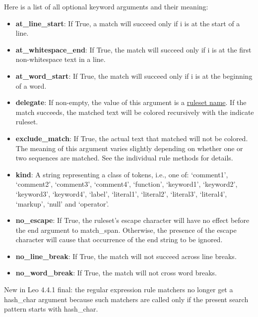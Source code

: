 \documentclass[a4paper,10pt,english]{sphinxmanual}
\begin{document}
Here is a list of all optional keyword arguments and their meaning:
\begin{itemize}
\item {} 
\textbf{at\_line\_start}:
If True, a match will succeed only if i is at the start of a line.

\item {} 
\textbf{at\_whitespace\_end}:
If True, the match will succeed only if i is at the first non-whitespace text in a line.

\item {} 
\textbf{at\_word\_start}:
If True, the match will succeed only if i is at the beginning of a word.

\item {} 
\textbf{delegate}:
If non-empty, the value of this argument is a {\hyperref[coloring:ruleset-names]{ruleset name}}.
If the match succeeds, the matched text will be colored recursively with the indicate ruleset.

\item {} 
\textbf{exclude\_match}:
If True, the actual text that matched will not be colored.
The meaning of this argument varies slightly depending on whether one or two sequences are matched.
See the individual rule methods for details.

\item {} 
\textbf{kind}: A string representing a class of tokens, i.e., one of:
`comment1', `comment2', `comment3', `comment4', `function',
`keyword1', `keyword2', `keyword3', `keyword4',
`label', `literal1', `literal2', `literal3', `literal4',
`markup', `null' and `operator'.

\item {} 
\textbf{no\_escape}:
If True, the ruleset's escape character will have no effect before the end argument to match\_span.
Otherwise, the presence of the escape character will cause that occurrence of the end string to be ignored.

\item {} 
\textbf{no\_line\_break}:
If True, the match will not succeed across line breaks.

\item {} 
\textbf{no\_word\_break}:
If True, the match will not cross word breaks.

\end{itemize}

New in Leo 4.4.1 final: the regular expression rule matchers no longer get a hash\_char argument
because such matchers are called only if the present search pattern starts with hash\_char.
\end{document}
